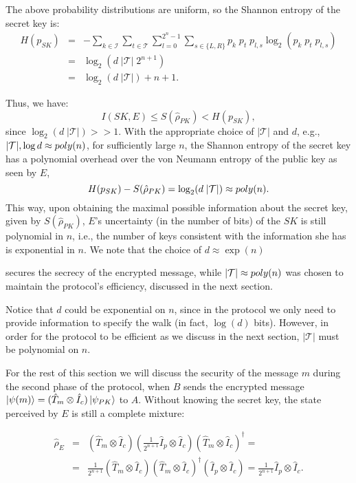 The above probability distributions are uniform, so the Shannon entropy of the secret key is:
\begin{eqnarray}
H(p_{SK})&=&
	-\sum_{k\in \mathcal I}\sum_{t\in \mathcal T}\sum_{l=0}^{2^{n}-1} \sum_{s\in\{L,R\}} p_k \; p_t \; p_{l,s}\log_2(p_k \; p_t \; p_{l,s})\nonumber\\[2mm]
	&=& \log_2(d \; |\mathcal T| \; 2^{n+1})\nonumber \\[2mm]
	&=& \log_2(d \; |\mathcal T| ) + n + 1.
\end{eqnarray}

Thus, we have:
\begin{equation}
I(SK,E)\leq S(\hat{\rho}_{PK})<H(p_{SK}),
\end{equation}
since $\log_2(d\; |\mathcal T|) >> 1$. 
With the appropriate choice of $|\mathcal T|$ and $d$, e.g.,  $|\mathcal T|, \log d \approx poly(n)$, for sufficiently large $n$, the Shannon entropy of the secret  key has a polynomial overhead over the von Neumann entropy of the public key as seen by $E$,  \begin{equation}H(p_{SK}) - S(\hat{\rho}_{PK}) = \log_2(d \; |\mathcal T| ) \approx poly(n).
\end{equation}
This way, upon obtaining the maximal possible information about the secret key, given by $S(\hat{\rho}_{PK})$, $E$'s uncertainty (in the number of bits) of the $SK$ is still polynomial in $n$, i.e., the number of keys consistent with the information she has is exponential in $n$. We note that the choice of $d \approx \exp(n)$ 
 
secures the secrecy of the encrypted message, while $|\mathcal T|  \approx poly(n)$ was chosen to maintain the protocol's efficiency, discussed in the next section.

Notice that $d$ could be exponential on $n$, since in the protocol we only need to provide information to specify the walk (in fact, $\log(d)$ bits). However, in order for the protocol to be efficient as we discuss in the next section, $|\mathcal T|$ must be polynomial on $n$.


For the rest of this section we will discuss the security of the message $m$ during the second phase of the protocol, when $B$ sends the encrypted message $\Ket{\psi(m)} = (\hat{T}_m\otimes \hat{I}_c) \Ket{\psi_{PK}}$ to $A$. Without knowing the secret key, the state perceived by $E$ is still a complete mixture: 

\begin{eqnarray}
\hat{\rho}_E 
	&=&  (\hat{T}_{m}\otimes \hat{I}_c) \left(\frac{1}{2^{n+1}}  \hat{I}_p \otimes \hat{I}_c\right) (\hat {T}_m\otimes \hat{I}_c)^{\dagger}=\nonumber\\	
	&=&  \frac{1}{2^{n+1}}(\hat {T}_m\otimes \hat{I}_c) (\hat{T}_m\otimes\hat{I}_c)^{\dagger}(\hat{I}_p \otimes \hat {I}_c) = \frac{1}{2^{n+1}}\hat{I}_p \otimes \hat{I}_c.
\end{eqnarray}

